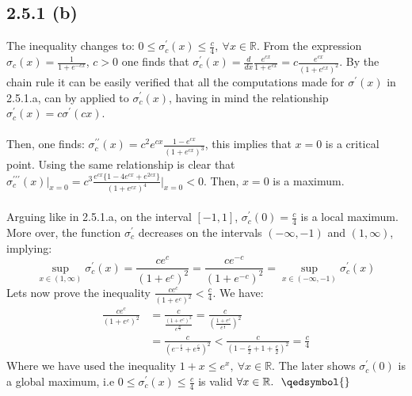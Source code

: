 \documentclass{exam}
\begin{document}
\subsection*{2.5.1 (b)}
The inequality changes to: $ 0 \leq \sigma^\prime_c(x) \leq \frac{c}{4}, \ \forall x \in \mathbb{R}$. From the expression $\sigma_c(x) = \frac{1}{1 + e^{-cx}}$, $c > 0$ one finds that $\sigma^{\prime}_c(x) = \frac{d}{d x} \frac{e^{cx}}{1 + e^{cx}} = \displaystyle c \frac{e^{cx}}{(1 + e^{cx})^2}$. By the chain rule it can be easily verified that all the computations 
made for $\sigma^{\prime}(x)$ in 2.5.1.a, can by applied to $\sigma^{\prime}_c(x)$, having in mind the relationship $\sigma^{\prime}_c(x) = c \sigma^{\prime}(cx)$. \\
\\
Then, one finds: $\sigma^{\prime\prime}_c(x) = c^{2} e^{cx}\frac{1-e^{cx}}{(1 + e^{cx})^3}$, this implies that $x=0$ is a critical point. Using the same relationship is clear that $\sigma^{\prime\prime\prime}_c(x) \Big|_{x=0} = c^{3}\frac{e^{cx} \{ 1 - 4e^{cx} + e^{2cx} \}}{(1 + e^{cx})^{4}} \Big|_{x=0} < 0$. Then, $x=0$ is a maximum. \\
\\
Arguing like in 2.5.1.a, on the interval $[-1,1]$, $\sigma^{\prime}_c(0) = \frac{c}{4}$ is a local maximum. More over, the function $\sigma^\prime_c$ decreases on the intervals
$(-\infty,-1)$ and $(1, \infty)$, implying: \newline
\begin{equation*}
    \displaystyle\sup_{x \in (1,\infty)}\sigma^{\prime}_c(x) = \displaystyle\frac{ce^{c}}{(1 + e^{c})^2} = \displaystyle\frac{ce^{-c}}{(1 + e^{-c})^2} = \sup_{x \in (-\infty,-1)} \sigma^{\prime}_c(x)
\end{equation*}
\newline
Lets now prove the inequality $ \displaystyle\frac{ce^{c}}{(1 + e^{c})^2} < \frac{c}{4}$. We have: 
\begin{equation*}
    \begin{aligned}
        \displaystyle\frac{ce^{c}}{(1 + e^{c})^2} &= \displaystyle\frac{c}{\frac{(1 + e^{c})^2}{\displaystyle e^{\frac{2c}{2}}}} = \displaystyle\frac{c}{(\frac{1 + e^{c}}{\displaystyle e^{\frac{c}{2}}})^2}\\
        &= \displaystyle \frac{c}{(e^{-\frac{c}{2}} + e^{\frac{c}{2}})^2} < \displaystyle \frac{c}{(1 - \frac{c}{2} + 1 + \frac{c}{2})^2} = \frac{c}{4}
    \end{aligned}
\end{equation*}
Where we have used the inequality $1 + x \leq e^x, \ \forall x \in \mathbb{R}$. The later shows $\sigma^{\prime}_c(0)$ is a global maximum, \newline 
i.e $0 \leq \sigma^\prime_c(x) \leq \frac{c}{4}$ is valid $\forall x \in \mathbb{R}. \text{ \ \qedsymbol{}}$
\end{document}
